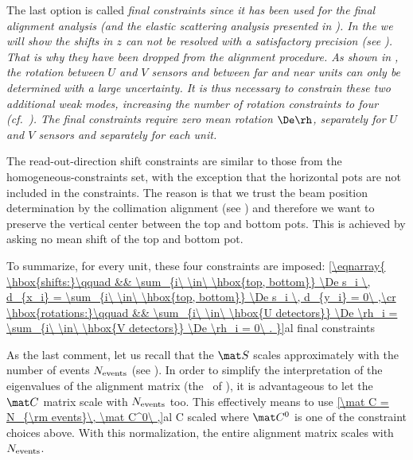 \> The last option is called \em{final constraints} since it has been used for the final alignment analysis (and the elastic scattering analysis presented in ). In the  we will show the shifts in $z$ can not be resolved with a satisfactory precision (see ). That is why they have been dropped from the alignment procedure. As shown in , the rotation between $U$ and $V$ sensors and between far and near units can only be determined with a large uncertainty. It is thus necessary to constrain these two additional weak modes, increasing the number of rotation constraints to four (cf.~). The final constraints require zero mean rotation $\De\rh$, separately for $U$ and $V$ sensors and separately for each unit.
\par\parindent\itindent\indent\hang
The read-out-direction shift constraints are similar to those from the homogeneous-constraints set, with the exception that the horizontal pots are not included in the constraints. The reason is that we trust the beam position determination by the collimation alignment (see ) and therefore we want to preserve the vertical center between the top and bottom pots. This is achieved by asking no mean shift of the top and bottom pot.
\par\parindent\itindent\indent\hang
To summarize, for every unit, these four constraints are imposed:
\eqref{\eqnarray{
\hbox{shifts:}\qquad && \sum_{i\ \in\ \hbox{top, bottom}} \De s_i \, d_{x_i} = \sum_{i\ \in\ \hbox{top, bottom}} \De s_i \, d_{y_i} = 0\ ,\cr
\hbox{rotations:}\qquad && \sum_{i\ \in\ \hbox{U detectors}} \De \rh_i = \sum_{i\ \in\ \hbox{V detectors}} \De \rh_i = 0\ .
}}{al final constraints}

\iffalse
\eqref{
	C = \pmatrix{
		\vdots	&\vdots	&		&		& \cr
		d_{ix}	&d_{iy}	&		&		& \cr
		\vdots	&\vdots	&		&		& \cr
				&		&\vdots	&\vdots	& \cr
				&		&d_{ix}	&d_{iy}	& \cr
				&		&\vdots	&\vdots	& \cr\ln
				&		&		&		&1		&0		& 		& 	\cr
				&		&		&		&0		&1		& 		& 	\cr
				&		&		&		&1		&0		& 		& 	\cr
				&		&		&		&0		&1		& 		& 	\cr
				&		&		&		&\vdots	&\vdots	& 		& 	\cr
				&		&		&		&		&		&1		&0		\cr
				&		&		&		&		&		&0		&1		\cr
				&		&		&		&		&		&1		&0		\cr
				&		&		&		&		&		&0		&1		\cr
				&		&		&		&		&		&\vdots	&\vdots	\cr
	}
}{al final cnst ex}
\fi

As the last comment, let us recall that the $\mat S$ scales approximately with the number of events $N_{\rm events}$ (see ). In order to simplify the interpretation of the eigenvalues of the alignment matrix (the \lhs~of ), it is advantageous to let the $\mat C$ matrix scale with $N_{\rm events}$ too. This effectively means to use
\eqref{\mat C = N_{\rm events}\, \mat C^0\ ,}{al C scaled}
where $\mat C^0$ is one of the constraint choices above. With this normalization, the entire alignment matrix scales with $N_{\rm events}$.


